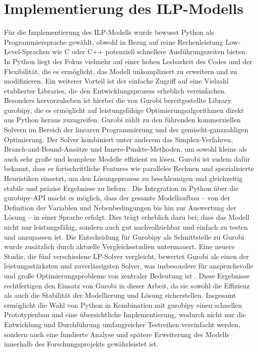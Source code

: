 \documentclass[bachelor, german]{algothesis}
\begin{document}
\section{Implementierung des ILP-Modells}
Für die Implementierung des ILP-Modells wurde bewusst Python als Programmiersprache gewählt, obwohl in Bezug auf reine Rechenleistung Low-Level-Sprachen wie C oder C++ potenziell schnellere Ausführungszeiten bieten. In Python liegt der Fokus vielmehr auf einer hohen Lesbarkeit des Codes und der Flexibilität, die es ermöglicht, das Modell unkompliziert zu erweitern und zu modifizieren. Ein weiterer Vorteil ist der einfache Zugriff auf eine Vielzahl etablierter Libraries, die den Entwicklungsprozess erheblich vereinfachen. Besonders hervorzuheben ist hierbei die von Gurobi bereitgestellte Library gurobipy, die es ermöglicht auf leistungsfähige Optimierungsalgorithmen direkt aus Python heraus zuzugreifen. \newline
Gurobi zählt zu den führenden kommerziellen Solvern im Bereich der linearen Programmierung und der gemischt-ganzzahligen Optimierung. Der Solver kombiniert unter anderem das Simplex-Verfahren, Branch-and-Bound-Ansätze und Innere-Punkte-Methoden, um sowohl kleine als auch sehr große und komplexe Modelle effizient zu lösen. Gurobi ist zudem dafür bekannt, dass er fortschrittliche Features wie paralleles Rechnen und spezialisierte Heuristiken einsetzt, um den Lösungsprozess zu beschleunigen und gleichzeitig stabile und präzise Ergebnisse zu liefern \cite{Gurobi2025}. Die Integration in Python über die gurobipy-API macht es möglich, dass der gesamte Modellaufbau – von der Definition der Variablen und Nebenbedingungen bis hin zur Auswertung der Lösung – in einer Sprache erfolgt. Dies trägt erheblich dazu bei, dass das Modell nicht nur leistungsfähig, sondern auch gut nachvollziehbar und einfach zu testen und anzupassen ist.\newline
Die Entscheidung für Gurobipy als Schnittstelle zu Gurobi wurde zusätzlich durch aktuelle Vergleichsstudien untermauert. Eine neuere Studie, die fünf verschiedene LP-Solver vergleicht, bewertet Gurobi als einen der leistungsstärksten und zuverlässigsten Solver, was insbesondere für anspruchsvolle und große Optimierungsprobleme von zentraler Bedeutung ist \cite{Gurobi}. Diese Ergebnisse rechtfertigen den Einsatz von Gurobi in dieser Arbeit, da sie sowohl die Effizienz als auch die Stabilität der Modellierung und Lösung sicherstellen. Insgesamt ermöglicht die Wahl von Python in Kombination mit gurobipy einen schnellen Prototypenbau und eine übersichtliche Implementierung, wodurch nicht nur die Entwicklung und Durchführung umfangreicher Testreihen vereinfacht werden, sondern auch eine fundierte Analyse und spätere Erweiterung des Modells innerhalb des Forschungsprojekts gewährleistet ist.
\end{document}
